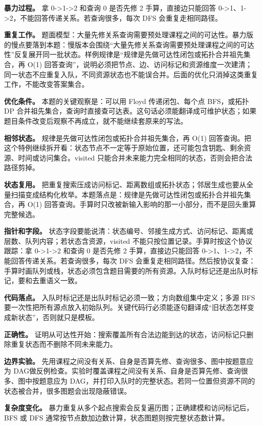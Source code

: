 \textbf{暴力过程。} 拿 0->1->2 和查询 0 是否先修 2 手算，直接边只能回答 0->1、1->2，不能回答传递关系。若查询很多，每次 DFS 会重复走相同路径。

\textbf{重复工作。} 题面模型：大量先修关系查询需要预处理课程之间的可达性。暴力版的慢点要落到本题：慢版本会围绕“大量先修关系查询需要预处理课程之间的可达性”反复展开同一批状态。样例规律是“规律是先做可达性闭包或拓扑合并祖先集合，再 O(1) 回答查询”，说明必须把节点、边、访问标记和资源维度一次建清；同一状态不应重复入队，不同资源状态也不能误合并。后面的优化只消掉这类重复工作，不能改变答案集合。

\textbf{优化条件。} 本题的关键观察是：可以用 Floyd 传递闭包、每个点 BFS，或拓扑 DP 合并祖先集合，查询时直接查可达表。这句话必须能翻译成可维护状态；如果题目条件改变后观察不再成立，就不能继续套原来的写法。

\textbf{相邻状态。} 规律是先做可达性闭包或拓扑合并祖先集合，再 O(1) 回答查询。把这个特例继续拆开看：状态节点不一定等于原始位置，还可能包含钥匙、剩余资源、时间或访问集合。visited 只能合并未来能力完全相同的状态，否则会把合法路径剪掉。

\textbf{状态复用。} 把重复搜索压成访问标记、距离数组或拓扑状态；邻居生成也要从全量扫描变成结构化枚举。本题落点是：规律是先做可达性闭包或拓扑合并祖先集合，再 O(1) 回答查询。手算时只改被新输入影响的那一小部分，而不是回头重算完整候选。

\textbf{指针和字段。} 状态字段要能说清：状态编号、邻接生成方式、访问标记、距离或层数、队列内容；若状态含资源，visited 不能只按位置记录。手算时按这个协议跟踪：拿 0->1->2 和查询 0 是否先修 2 手算，直接边只能回答 0->1、1->2，不能回答传递关系。若查询很多，每次 DFS 会重复走相同路径。然后按协议复查：手算时画队列或栈，状态必须包含题目需要的所有资源。入队时标记还是出队时标记，要和去重语义一致。

\textbf{代码落点。} 入队时标记还是出队时标记必须一致；方向数组集中定义；多源 BFS 要一次性把所有源点放入初始队列。关键代码行必须能逐句翻译成“旧状态怎样变成新状态”，否则就只是模板。

\textbf{正确性。} 证明从可达性开始：搜索覆盖所有合法边能到达的状态，访问标记只删除重复状态而不删除不同未来能力。

\textbf{边界实验。} 先用课程之间没有关系、自身是否算先修、查询很多、图中按题意应为 DAG做反例检查。实验时覆盖课程之间没有关系、自身是否算先修、查询很多、图中按题意应为 DAG，并打印入队时的完整状态。若同一位置但资源不同的状态被合并，很多图题会出现隐蔽错误。

\textbf{复杂度变化。} 暴力重复从多个起点搜索会反复遍历图；正确建模和访问标记后，BFS 或 DFS 通常按节点数加边数计算，状态图题则按完整状态数计算。

